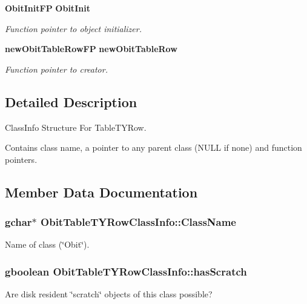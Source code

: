 \begin{CompactItemize}
{\bf Obit\-Init\-FP} {\bf Obit\-Init}
\begin{CompactList}\small\item\em Function pointer to object initializer. \item\end{CompactList}\item 
{\bf new\-Obit\-Table\-Row\-FP} {\bf new\-Obit\-Table\-Row}
\begin{CompactList}\small\item\em Function pointer to creator. \item\end{CompactList}\end{CompactItemize}


\subsection{Detailed Description}
Class\-Info Structure For Table\-TYRow. 

Contains class name, a pointer to any parent class (NULL if none) and function pointers. 



\subsection{Member Data Documentation}
\subsubsection{\setlength{\rightskip}{0pt plus 5cm}gchar$\ast$ {\bf Obit\-Table\-TYRow\-Class\-Info::Class\-Name}}\label{structObitTableTYRowClassInfo_o2}


Name of class (\char`\"{}Obit\char`\"{}). 

\subsubsection{\setlength{\rightskip}{0pt plus 5cm}gboolean {\bf Obit\-Table\-TYRow\-Class\-Info::has\-Scratch}}\label{structObitTableTYRowClassInfo_o1}


Are disk resident \char`\"{}scratch\char`\"{} objects of this class possible? 

